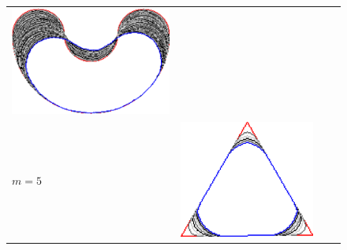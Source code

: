 {\begin{figure}
\begin{tabular}{p{3em}ccc}
\includegraphics[scale=0.25]{figures/chapter6/level-effect/bean/improve/len_pen0/radius-5/level4/summary.pdf} \\[2em]
$m=5$ & \includegraphics[scale=0.25]{figures/chapter6/level-effect/triangle/improve/len_pen0/radius-5/level5/summary.pdf} &

\end{tabular}
\end{figure}}
